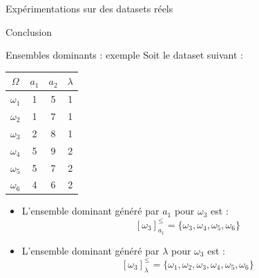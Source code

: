 \documentclass[usenames,dvipsnames]{beamer}
\begin{document}
\begin{frame}{Expérimentations sur des datasets réels}
\end{frame}

\begin{frame}{Conclusion}

\end{frame}

\begin{frame}[allowframebreaks]
  \printbibliography
\end{frame}

\begin{frame}
  \titlepage
\end{frame}


\begin{frame}{Ensembles dominants : exemple}
Soit le dataset suivant :

\begin{table}
\begin{tabular}{|*{3}{c|} | c |}
    \hline
        $\Omega$ & $a_1$ & $a_2$ & $\lambda$ \\
    \hline 
        $\omega_1$ & 1 & 5 & 1 \\ 
        $\omega_2$ & 1 & 7 & 1 \\
        $\omega_3$ & 2 & 8 & 1\\
        $\omega_4$ & 5 & 9 & 2 \\
        $\omega_5$ & 5 & 7 & 2 \\ 
        $\omega_6$ & 4  & 6 & 2\\
    \hline
\end{tabular}

\begin{itemize}
    \item L'ensemble dominant généré par $a_1$ pour $\omega_3$ est : 
        $$[\omega_3]^{\leq}_{a_1} = \{\omega_3, \omega_4, \omega_5, \omega_6\}$$
    \item L'ensemble dominant généré par $\lambda$ pour $\omega_3$ est :
        $$[\omega_3]^{\leq}_{\lambda} = \{\omega_1, \omega_2, \omega_3, \omega_4, \omega_5, \omega_6\}$$
\end{itemize}
\label{tab:dsa-dataset}
\end{table}
\end{frame}
\end{document}
